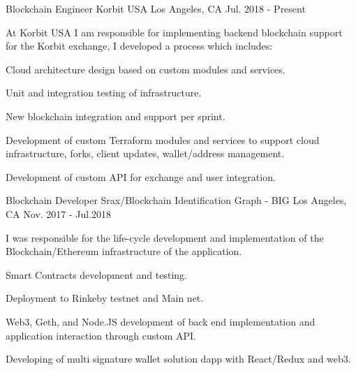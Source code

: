 


\begin{cventries}


\cventry
{Blockchain Engineer} %
{Korbit USA} %
{Los Angeles, CA} %
{Jul. 2018 - Present} %
{ %
\begin{cvitems}
\item[] {At Korbit USA I am responsible for implementing backend blockchain support for the Korbit exchange, I developed a process which includes:} %
\item {Cloud architecture design based on custom modules and services.}
\item {Unit and integration testing of infrastructure.}
\item {New blockchain integration and support per sprint.}
\item {Development of custom Terraform modules and services to support cloud infrastructure, forks, client updates, wallet/address management.}
\item {Development of custom API for exchange and user integration.}
\end{cvitems}
}


\cventry
{Blockchain Developer} %
{Srax/Blockchain Identification Graph - BIG} %
{Los Angeles, CA} %
{Nov. 2017 - Jul.2018} %
{ %
\begin{cvitems}
\item[] {I was responsible for the life-cycle development and implementation of the Blockchain/Ethereum infrastructure of the application.} %
\item {Smart Contracts development and testing.}
\item {Deployment to Rinkeby testnet and Main net.}
\item {Web3, Geth, and Node.JS development of back end implementation and application interaction through custom API.}
\item {Developing of multi signature wallet solution dapp with React/Redux and web3.}
\end{cvitems}
}


\end{cventries}
